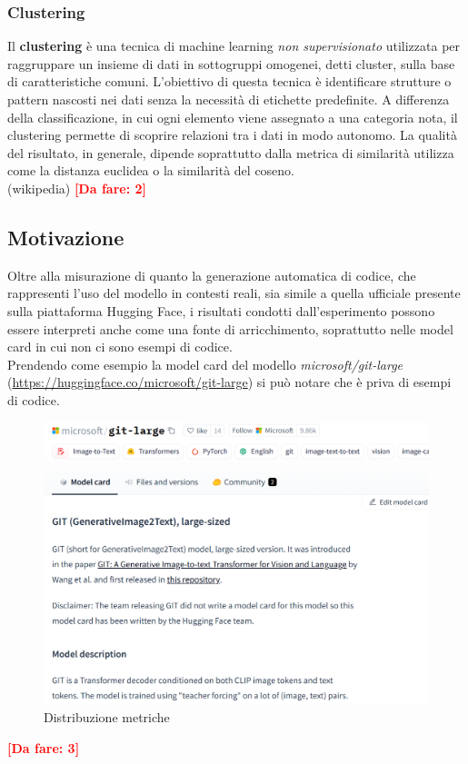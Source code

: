 \documentclass{article}
\newcommand{\dafare}[1]{\textbf{\textcolor{red}{[Da fare: #1]}}}
\begin{document}
\subsubsection{Clustering}
Il \textbf{clustering} è una tecnica di machine learning \textit{non supervisionato} utilizzata per raggruppare un insieme di dati in sottogruppi omogenei, detti cluster, sulla base di caratteristiche comuni. L'obiettivo di questa tecnica è identificare strutture o pattern nascosti nei dati senza la necessità di etichette predefinite. A differenza della classificazione, in cui ogni elemento viene assegnato a una categoria nota, il clustering permette di scoprire relazioni tra i dati in modo autonomo. La qualità del risultato, in generale, dipende soprattutto dalla metrica di similarità utilizza come la distanza euclidea o la similarità del coseno.\\ (wikipedia)
\dafare{2}

\subsection{Motivazione} \label{motivation}
Oltre alla misurazione di quanto la generazione automatica di codice, che rappresenti l'uso del modello in contesti reali, sia simile a quella ufficiale presente sulla piattaforma Hugging Face, i risultati condotti dall'esperimento possono essere interpreti anche come una fonte di arricchimento, soprattutto nelle model card in cui non ci sono esempi di codice.\\
Prendendo come esempio la model card del modello \textit{microsoft/git-large} (\url{https://huggingface.co/microsoft/git-large}) si può notare che è priva di esempi di codice.
\begin{figure}[htbp]
    \centering
    \includegraphics[width=\textwidth]{img/model_card_senza_codice.png}
    \caption{Distribuzione metriche}
    \label{fig:motivazione}
\end{figure}
\dafare{3}
\end{document}
